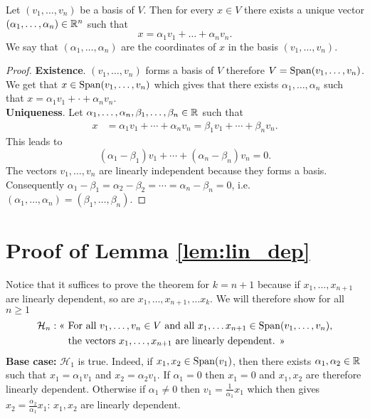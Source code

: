 \documentclass[11pt,nocut]{article}
\begin{document}
\begin{proposition}[Coordinates]
	Let $(v_1, \dots, v_n)$ be a basis of $V$. Then for every $x \in V$ there exists a unique vector $(\alpha_1, \dots, \alpha_n) \in \mathbb{R}^n$ such that
	$$
	x = \alpha_1 v_1 + \dots + \alpha_n v_n.
	$$
	We say that $(\alpha_1, \dots, \alpha_n)$ are the coordinates of $x$ in the basis $(v_1, \dots, v_n)$.
\end{proposition}
\begin{proof}
	\textbf{Existence}. $(v_1, \dots, v_n)$ forms a basis of $V$ therefore  $V = {{\rm Span}}(v_1, \dots, v_n)$. We get that $x \in {{\rm Span}}(v_1, \dots, v_n)$ which gives that there exists $\alpha_1, \dots, \alpha_n$ such that $x = \alpha_1 v_1 + \cdot + \alpha_n v_n$.
	\\
	\textbf{Uniqueness}. Let $\alpha_1, \dots, \alpha_n, \beta_1, \dots, \beta_n \in \mathbb{R}$ such that
	\begin{align*}
		x &= \alpha_1 v_1 + \cdots + \alpha_n v_n = \beta_1 v_1 + \cdots + \beta_n v_n.
	\end{align*}
	This leads to
	$$
	(\alpha_1 - \beta_1) v_1 + \cdots + (\alpha_n - \beta_n) v_n = 0.
	$$
	The vectors $v_1, \dots, v_n$ are linearly independent because they forms a basis. Consequently $\alpha_1 - \beta_1 = \alpha_2 - \beta_2 = \cdots =  \alpha_n - \beta_n = 0$, i.e.\ $(\alpha_1, \dots, \alpha_n) = (\beta_1, \dots, \beta_n)$.
\end{proof}


\section*{Proof of Lemma \ref{lem:lin_dep}}\label{sec:proof_lin_dep}
Notice that it suffices to prove the theorem for $k = n+1$ because if $x_1, \dots, x_{n+1}$ are linearly dependent, so are $x_1, \dots, x_{n+1}, \dots x_k$. We will therefore show for all $n \geq 1$
\begin{align*}
	\mathcal{H}_n: \text{<< } &\text{For all } v_1, \dots, v_{n} \in V \ \text{and all } x_{1}, \dots x_{n+1} \in {{\rm Span}}(v_1, \dots, v_n), \\ &\text{the vectors } x_1, \dots, x_{n+1} \ \text{are linearly dependent. >>}
\end{align*}
\textbf{Base case:} $\mathcal{H}_1$ is true. Indeed, if $x_1,x_2 \in {{\rm Span}}(v_1)$, then there exists $\alpha_1, \alpha_2 \in \mathbb{R}$ such that $x_1 = \alpha_1 v_1$ and $x_2 = \alpha_2 v_1$. If $\alpha_1 = 0$ then $x_1 = 0$ and $x_1,x_2$ are therefore linearly dependent. 
Otherwise if $\alpha_1 \neq 0$ then $v_1 = \frac{1}{\alpha_1} x_1$ which then gives $x_2 = \frac{\alpha_2}{\alpha_1} x_1$: $x_1,x_2$ are linearly dependent. 
\\
\end{document}
